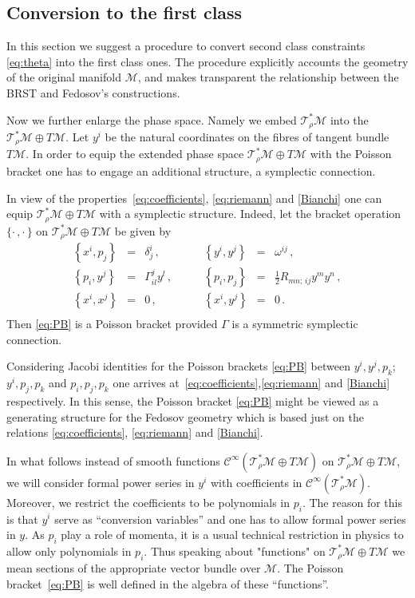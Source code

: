 \documentclass[a4paper,11pt,oneside]{amsart}
\theoremstyle{plain}
\numberwithin{equation}{section} %
\numberwithin{figure}{section} %
\newcommand{\pb}[2]{\left\{{}#1{},{}#2{}\right\}}
\newcommand{\func}[1]{{{\mathcal C}^\infty}{(#1)}}             %
\def\half{\frac{1}{2}}
\def\mod{{\mathcal T}^*_\rho}
\def\manM{{\mathcal M}}
\begin{document}
\subsection{Conversion to the first class}

\noindent
In this section we suggest a procedure to convert second class
constraints \eqref{eq:theta} into the first class ones. The procedure
explicitly accounts the geometry of the original manifold $\manM$,
and makes transparent the relationship between the BRST and
Fedosov's constructions.

\noindent
Now we further enlarge the phase space. Namely we embed
$\mod\manM$ into the $\mod\manM \oplus T\manM$. Let
$y^i$ be the natural coordinates on the fibres of tangent
bundle $T\manM$. In order to equip the extended phase space
$\mod\manM \oplus T\manM$ with the Poisson bracket one has
to engage an additional structure, a symplectic connection.


\noindent
In view of the properties~\eqref{eq:coefficients},
\eqref{eq:riemann} and \eqref{Bianchi} one can equip
$\mod\manM\oplus T\manM$ with a symplectic structure.  Indeed,
let the bracket operation
$\{\cdot\,,\cdot\,\}$ on $\mod\manM \oplus T\manM$
be given by
\begin{equation}
\label{eq:PB}
\begin{array}{rclrcl}
\displaystyle
\pb{x^i}{p_j}&=&\delta^i_j\,,&  \quad \quad
\pb{y^i}{y^j}&=&\omega^{ij}\,,\\ [3pt]
\pb{p_i}{y^j}&=&\Gamma^j_{il} y^l \,,& \quad \quad
\pb{p_i}{p_j}&=&\half R_{mn;\,ij}y^m y^n\,, \\ [3pt]
\pb{x^i}{x^j}&=&0\,,& \quad \quad
\pb{x^i}{y^j}&=&0\,.\\
\end{array}
\end{equation}
Then \eqref{eq:PB} is a Poisson bracket provided
$\Gamma$ is a symmetric symplectic connection.

\noindent
Considering Jacobi identities for the Poisson brackets \eqref{eq:PB}
between $y^i, y^j, p_k$; \, $y^i, p_j, p_k$ and $p_i, p_j, p_k$
one arrives at~\eqref{eq:coefficients},\eqref{eq:riemann}
and \eqref{Bianchi} respectively. In this sense, the Poisson bracket
\eqref{eq:PB} might be viewed as a generating structure for
the Fedosov geometry which is based just on the relations
\eqref{eq:coefficients}, \eqref{eq:riemann} and \eqref{Bianchi}.

\noindent
In what follows instead of smooth functions
$\func{\mod\manM \oplus T\manM}$ on $\mod\manM \oplus T\manM$, we will consider
formal power series in $y^i$ with coefficients in $\func{\mod\manM}$.  Moreover,
we restrict the coefficients to be polynomials in $p_i$.  The reason
for this is that $y^i$ serve as ``conversion variables'' and
one has to allow formal power series in $y$.   As $p_i$ play a role of
momenta, it is a usual technical restriction in physics to allow
only polynomials in $p_i$.  Thus speaking about "functions"
on $\mod\manM \oplus T\manM$ we mean sections of the appropriate
vector bundle over $\manM$.  The Poisson bracket~\eqref{eq:PB}
is well defined in the algebra of these ``functions''.
\end{document}
